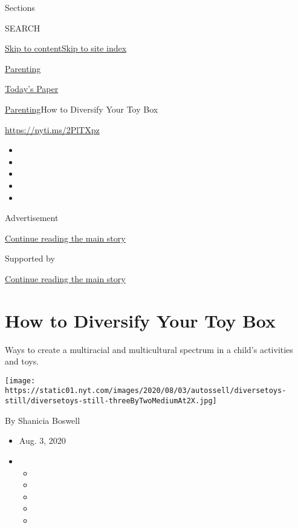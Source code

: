 Sections

SEARCH

\protect\hyperlink{site-content}{Skip to
content}\protect\hyperlink{site-index}{Skip to site index}

\href{https://www.nytimes.com/section/parenting}{Parenting}

\href{https://myaccount.nytimes.com/auth/login?response_type=cookie\&client_id=vi}{}

\href{https://www.nytimes.com/section/todayspaper}{Today's Paper}

\href{/section/parenting}{Parenting}\textbar{}How to Diversify Your Toy
Box

\url{https://nyti.ms/2PlTXpz}

\begin{itemize}
\item
\item
\item
\item
\item
\end{itemize}

Advertisement

\protect\hyperlink{after-top}{Continue reading the main story}

Supported by

\protect\hyperlink{after-sponsor}{Continue reading the main story}

\hypertarget{how-to-diversify-your-toy-box}{%
\section{How to Diversify Your Toy
Box}\label{how-to-diversify-your-toy-box}}

Ways to create a multiracial and multicultural spectrum in a child's
activities and toys.

\texttt{[image: https://static01.nyt.com/images/2020/08/03/autossell/diversetoys-still/diversetoys-still-threeByTwoMediumAt2X.jpg]}

By Shanicia Boswell

\begin{itemize}
\item
  Aug. 3, 2020
\item
  \begin{itemize}
  \item
  \item
  \item
  \item
  \item
  \end{itemize}
\end{itemize}

